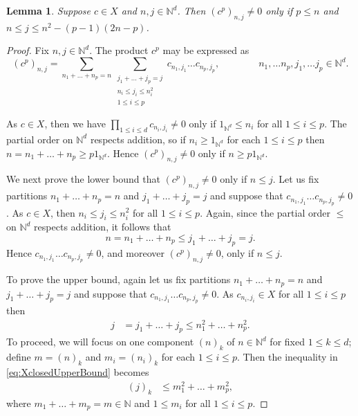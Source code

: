 \documentclass{article}
\newtheorem{lemma}[theorem]{Lemma}
\newcommand{\N}{\mathbb{N}}
\begin{document}
\begin{lemma}\label{prop:Xclosed}
	Suppose  $ c \in X$ and $ n,j \in \N^d$. Then $ (c^p)_{n,j} \neq 0  $ only if $p \leq n$ and $ n \leq j \leq n^2 - (p-1)(2n-p)$. 
\end{lemma}
\begin{proof}
	Fix $ n , j \in \N^d$. 
	The product $ c^p$ may be expressed as  
	\[
	(c^p)_{n,j} = 
	\sum_{n_1 + \dots + n_p=n} 
	\sum_{\substack{ 
		j_1 + \dots + j_p =j \\
		n_{i} \leq j_i \leq n_{i}^2 \\
		1 \leq i \leq p
	}   }
	c_{n_1,j_1} \dots c_{n_p , j_p}
	,
	\qquad \qquad 
	n_1, \dots n_p,j_1 , \dots j_p \in \N^d .
	\]
	
	As $c \in X$, then  we have $ \prod_{1\leq i\leq d} c_{n_i,j_i} \neq 0$ only if $ 1_{\N^d} \leq n_i$ for all $1 \leq i \leq p$. 
	The partial order on $\N^d$ respects addition, so if $ n_i \geq 1_{\N^d} $ for each $1 \leq i \leq p$   then  $n = n_1 + \dots + n_p \geq p 1_{\N^d}$.  
	Hence $(c^p)_{n,j} \neq 0$ only if $ n \geq p 1_{\N^d} $. 
	
	We next prove the lower bound that $ (c^p)_{n,j} \neq 0 $ only if $ n \leq j$.  
	Let us fix partitions $ n_1 + \dots + n_p = n$ and $j_1 + \dots + j_p =j$ and suppose that $ 	c_{n_1,j_1} \dots c_{n_p , j_p} \neq 0$. 
	As $c \in X$, then $ n_i \leq j_i \leq n_i^2$ for all $ 1 \leq i \leq p$.  
	Again, since the partial order $\leq $ on $\N^d$ respects addition, it follows that 
	\[
	n = n_1 + \dots + n_p \leq j_1 + \dots + j_p = j .
	\]
	 Hence $	c_{n_1,j_1} \dots c_{n_p , j_p} \neq 0 $, and moreover $ (c^p)_{n,j} \neq 0$,  only if $n \leq j$.  
	
	To prove the upper bound, again 	let us fix partitions $ n_1 + \dots + n_p = n$ and $j_1 + \dots + j_p =j$ and suppose that $ 	c_{n_1,j_1} \dots c_{n_p , j_p} \neq 0$. 
	As $c_{n_i,j_i} \in X$ for all $ 1 \leq i \leq p$ then 
\begin{align}
		j &= j_1 + \dots + j_p \leq n_1^2 + \dots + n_p^2 . \label{eq:XclosedUpperBound}
\end{align} 
	To proceed, we will focus on one component $(n)_k$ of $n \in \N^d$ for  fixed $1 \leq k \leq d$; define $ m = (n)_k$ and $ m_i = (n_i)_k$ for each $1 \leq i \leq p$. 
	Then the  inequality in \eqref{eq:XclosedUpperBound} becomes 
\begin{align} \label{eq:XclosedUpperBoundReduced}
		(j)_k  &\leq m_1^2 + \dots + m_p^2 ,
\end{align}
	where $ m_1 + \dots + m_p = m \in \N$ and $ 1 \leq m_i$ for all $ 1 \leq i \leq p$.     
	

\end{proof}
\end{document}
